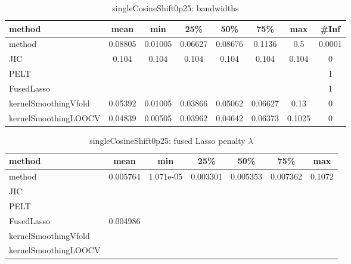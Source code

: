 \begin{table}[ht]
\centering
\begin{tabular}{l|c|ccccc|c}
  \hline
method & mean & min & 25\% & 50\% & 75\% & max & \#Inf \\ 
  \hline
method & 0.08805 & 0.01005 & 0.06627 & 0.08676 & 0.1136 &   0.5 & 0.0001 \\ 
  JIC & 0.104 & 0.104 & 0.104 & 0.104 & 0.104 & 0.104 &   0 \\ 
  PELT &  &  &  &  &  &  &   1 \\ 
  FusedLasso &  &  &  &  &  &  &   1 \\ 
  kernelSmoothingVfold & 0.05392 & 0.01005 & 0.03866 & 0.05062 & 0.06627 &  0.13 &   0 \\ 
  kernelSmoothingLOOCV & 0.04839 & 0.00505 & 0.03962 & 0.04642 & 0.06373 & 0.1025 &   0 \\ 
   \hline
\end{tabular}
\caption{singleCosineShift0p25: bandwidths} 
\label{tab:singleCosineShift0p25Bandwidths}
\end{table}
\begin{table}[ht]
\centering
\begin{tabular}{l|c|ccccc}
  \hline
method & mean & min & 25\% & 50\% & 75\% & max \\ 
  \hline
method & 0.005764 & 1.071e-05 & 0.003301 & 0.005353 & 0.007362 & 0.1072 \\ 
  JIC &  &  &  &  &  &  \\ 
  PELT &  &  &  &  &  &  \\ 
  FusedLasso & 0.004986 &  &  &  &  &  \\ 
  kernelSmoothingVfold &  &  &  &  &  &  \\ 
  kernelSmoothingLOOCV &  &  &  &  &  &  \\ 
   \hline
\end{tabular}
\caption{singleCosineShift0p25: fused Lasso penalty $\lambda$} 
\label{tab:singleCosineShift0p25Lambdas}
\end{table}
